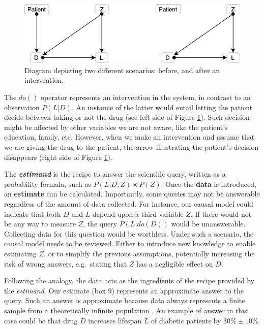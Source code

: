 \documentclass[
]{book}
\begin{document}
\begin{figure}

{\centering \includegraphics[width=0.7\linewidth]{Figures/blueprint} 

}

\caption{Diagram depicting two different scenarios: before, and after an intervention.}\label{fig:blueprint}
\end{figure}

The \(do()\) operator represents an intervention in the system, in contrast to an observation \(P(L|D)\). An instance of the latter would entail letting the patient decide between taking or not the drug (see left side of Figure \ref{fig:blueprint}). Such decision might be affected by other variables we are not aware, like the patient's education, family, etc. However, when we make an intervention and assume that we are giving the drug to the patient, the arrow illustrating the patient's decision disappears (right side of Figure \ref{fig:blueprint}).

The \textbf{\emph{estimand}} is the recipe to answer the scientific query, written as a probability formula, such as \(P(L | D, Z) \times P(Z)\). Once the \textbf{data} is introduced, an \textbf{estimate} can be calculated. Importantly, some queries may not be answerable regardless of the amount of data collected. For instance, our causal model could indicate that both \(D\) and \(L\) depend upon a third variable \(Z\). If there would not be any way to measure \(Z\), the query \(P(L | do(D))\) would be unanswerable. Collecting data for this question would be worthless. Under such a scenario, the causal model needs to be reviewed. Either to introduce new knowledge to enable estimating \(Z\), or to simplify the previous assumptions, potentially increasing the risk of wrong answers, e.g.~stating that \(Z\) has a negligible effect on \(D\).

Following the analogy, the data acts as the ingredients of the recipe provided by the \emph{estimand}. Our estimate (box \(9\)) represents an approximate answer to the query. Such an answer is approximate because data always represents a finite sample from a theoretically infinite population \citep{book-of-why}. An example of answer in this case could be that drug \(D\) increases lifespan \(L\) of diabetic patients by \(30\% \pm 10\%\).
\end{document}
